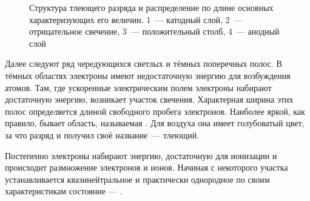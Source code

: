 


\begin{figure}[h!]
	\centering
	\caption{Структура тлеющего разряда и распределение по длине основных 
        характеризующих его величин. 
        1~--- катодный слой,
        2~--- отрицательное свечение,
        3~--- положительный столб,
        4~--- анодный слой
        }
\end{figure}

Далее следуют ряд чередующихся светлых и тёмных поперечных полос. 
В тёмных областях электроны имеют недостаточную энергию 
для возбуждения атомов. Там, где ускоренные электрическим полем электроны 
набирают достаточную энергию, возникает участок свечения.
Характерная ширина этих полос определяется длиной свободного пробега электронов.
Наиболее яркой, как правило, бывает область,
называемая .
Для воздуха она имеет голубоватый цвет, за что разряд и получил своё 
название~--- тлеющий.

Постепенно электроны набирают энергию, достаточную для ионизации
и происходит размножение электронов и ионов.
Начиная с некоторого участка устанавливается квазинейтральное
и практически однородное по своим характеристикам состояние 
--- .




